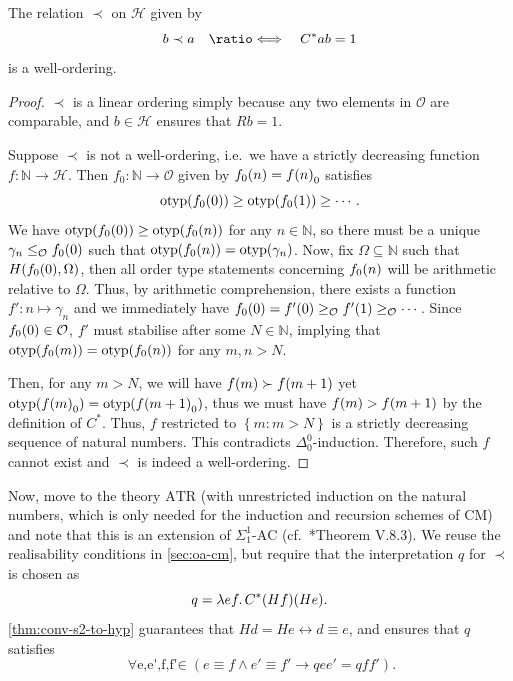 \documentclass[12pt,openany]{book}
\theoremstyle{plain}
\theoremstyle{definition}
\newcommand\opA[1]{\mathop{\forall #1}}
\newcommand\oplam[1]{\mathop{\lambda #1.}}
\newcommand\defeqv{\quad \ratio\Longleftrightarrow \quad}
\DeclareMathOperator\otyp{otyp}
\newcommand\ATR{\mathrm{ATR}}
\newcommand\AC{\text{-}\mathrm{AC}}
\newcommand\CM{\mathrm{CM}}
\begin{document}
\begin{proposition}
  \label{prop:hyp-ind-cmp-wo}
  The relation $\prec$ on $\mathcal{H}$ given by
  \[b \prec a \defeqv C^* ab = 1\]
  is a well-ordering.
\end{proposition}

\begin{proof}
  $\prec$ is a linear ordering simply because any two elements in $\mathcal{O}$ are comparable, and $b \in \mathcal{H}$ ensures that $Rb = 1$.

  Suppose $\prec$ is not a well-ordering, i.e.\ we have a strictly decreasing function $f : \mathbb{N} \rightarrow \mathcal{H}$. Then $f_0 : \mathbb{N} \rightarrow \mathcal{O}$ given by $f_0\mleft(n\mright) = f\mleft(n\mright)_0$ satisfies
  \[\otyp\mleft(f_0\mleft(0\mright)\mright) \geq \otyp\mleft(f_0\mleft(1\mright)\mright) \geq \cdots.\]
  We have $\otyp\mleft(f_0\mleft(0\mright)\mright) \geq \otyp\mleft(f_0\mleft(n\mright)\mright)$ for any $n \in \mathbb{N}$, so there must be a unique $\gamma_n \leq_\mathcal{O} f_0\mleft(0\mright)$ such that $\otyp\mleft(f_0\mleft(n\mright)\mright) = \otyp\mleft(\gamma_n\mright)$. Now, fix $\Omega \subseteq \mathbb{N}$ such that $H\mleft(f_0\mleft(0\mright), \Omega\mright)$, then all order type statements concerning $f_0\mleft(n\mright)$ will be arithmetic relative to $\Omega$. Thus, by arithmetic comprehension, there exists a function $f' : n \mapsto \gamma_n$ and we immediately have $f_0\mleft(0\mright) = f'\mleft(0\mright) \geq_\mathcal{O} f'\mleft(1\mright) \geq_\mathcal{O} \cdots$. Since $f_0\mleft(0\mright) \in \mathcal{O}$, $f'$ must stabilise after some $N \in \mathbb{N}$, implying that $\otyp\mleft(f_0\mleft(m\mright)\mright) = \otyp\mleft(f_0\mleft(n\mright)\mright)$ for any $m, n > N$.

  Then, for any $m > N$, we will have $f\mleft(m\mright) \succ f\mleft(m + 1\mright)$ yet $\otyp\mleft(f\mleft(m\mright)_0\mright) = \otyp\mleft(f\mleft(m + 1\mright)_0\mright)$, thus we must have $f\mleft(m\mright) > f\mleft(m + 1\mright)$ by the definition of $C^*$. Thus, $f$ restricted to $\left\{m : m > N\right\}$ is a strictly decreasing sequence of natural numbers. This contradicts $\Delta^0_0$-induction. Therefore, such $f$ cannot exist and $\prec$ is indeed a well-ordering.
\end{proof}

Now, move to the theory $\ATR$ (with unrestricted induction on the natural numbers, which is only needed for the induction and recursion schemes of $\CM$) and note that this is an extension of $\Sigma^1_1\AC$ (cf.\ \cite{simpson09-soa}*{Theorem V.8.3}). We reuse the realisability conditions in \autoref{sec:oa-cm}, but require that the interpretation $q$ for $\prec$ is chosen as
\[q = \oplam{ef} C^* \mleft(Hf\mright) \mleft(He\mright).\]
\autoref{thm:conv-s2-to-hyp} guarantees that $Hd = He \leftrightarrow d \equiv e$, and ensures that $q$ satisfies
\[\opA{e, e', f, f' \in S_2} \left(e \equiv f \land e' \equiv f' \rightarrow qe e' = qf f'\right).\]
\end{document}
